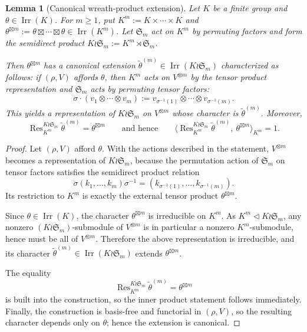 \documentclass{amsart}
\theoremstyle{plain}
\numberwithin{equation}{section}
\newtheorem{lemma}[theorem]{Lemma}
\theoremstyle{definition}
\newcommand{\Res}{\operatorname{Res}}
\newcommand{\Irr}{\operatorname{Irr}}
\begin{document}
\begin{lemma}[Canonical wreath-product extension]\label{lem:wreath-extension}
Let $K$ be a finite group and $\theta\in\Irr(K)$.  For $m\ge 1$, put $K^m:=K\times\cdots\times K$ and
$\theta^{\boxtimes m}:=\theta\boxtimes\cdots\boxtimes\theta\in\Irr(K^m)$.  Let $\mathfrak S_m$ act on $K^m$
by permuting factors and form the semidirect product $K\wr \mathfrak S_m:=K^m\rtimes \mathfrak S_m$.

Then $\theta^{\boxtimes m}$ has a \emph{canonical} extension $\widetilde\theta^{(m)}\in\Irr(K\wr\mathfrak S_m)$
characterized as follows: if $(\rho,V)$ affords $\theta$, then $K^m$ acts on $V^{\otimes m}$ by the tensor
product representation and $\mathfrak S_m$ acts by permuting tensor factors:
\[
\sigma\cdot(v_1\otimes\cdots\otimes v_m):=v_{\sigma^{-1}(1)}\otimes\cdots\otimes v_{\sigma^{-1}(m)}.
\]
This yields a representation of $K\wr\mathfrak S_m$ on $V^{\otimes m}$ whose character is $\widetilde\theta^{(m)}$.
Moreover,
\[
\Res^{K\wr\mathfrak S_m}_{K^m}\widetilde\theta^{(m)}=\theta^{\boxtimes m}
\qquad\text{and hence}\qquad
\bigl\langle \Res^{K\wr\mathfrak S_m}_{K^m}\widetilde\theta^{(m)},\ \theta^{\boxtimes m}\bigr\rangle_{K^m}=1.
\]
\end{lemma}

\begin{proof}
Let $(\rho,V)$ afford $\theta$.  With the actions described in the statement,
$V^{\otimes m}$ becomes a representation of $K\wr \mathfrak S_m$, because the
permutation action of $\mathfrak S_m$ on tensor factors satisfies the semidirect
product relation
\[
\sigma (k_1,\dots,k_m)\sigma^{-1}=(k_{\sigma^{-1}(1)},\dots,k_{\sigma^{-1}(m)}).
\]
Its restriction to $K^m$ is exactly the external tensor product
$\theta^{\boxtimes m}$.

Since $\theta\in\Irr(K)$, the character $\theta^{\boxtimes m}$ is irreducible on
$K^m$.  As $K^m\triangleleft K\wr \mathfrak S_m$, any nonzero
$(K\wr \mathfrak S_m)$-submodule of $V^{\otimes m}$ is in particular a nonzero
$K^m$-submodule, hence must be all of $V^{\otimes m}$.  Therefore the above
representation is irreducible, and its character
$\widetilde\theta^{(m)}\in\Irr(K\wr \mathfrak S_m)$ extends
$\theta^{\boxtimes m}$.

The equality
\[
\Res^{K\wr \mathfrak S_m}_{K^m}\widetilde\theta^{(m)}=\theta^{\boxtimes m}
\]
is built into the construction, so the inner product statement follows
immediately.  Finally, the construction is basis-free and functorial in $(\rho,V)$,
so the resulting character depends only on $\theta$; hence the extension is canonical.
\end{proof}
\end{document}
